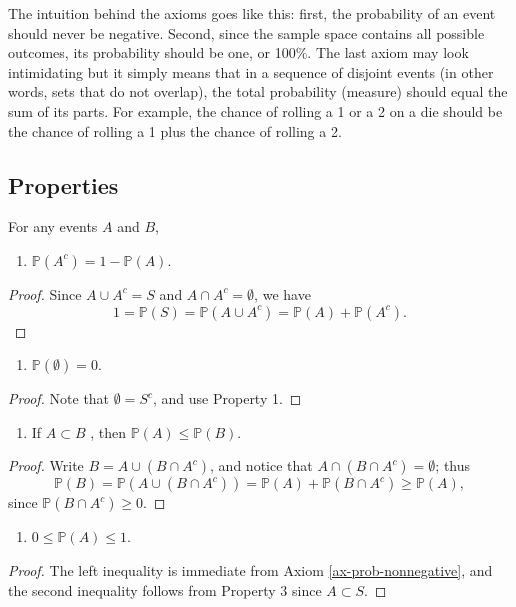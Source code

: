 \documentclass[captions=tableheading]{scrbook}
\begin{document}
The intuition behind the axioms goes like this: first, the probability of an event should never be negative. Second, since the sample space contains all possible outcomes, its probability should be one, or 100\%. The last axiom may look intimidating but it simply means that in a sequence of disjoint events (in other words, sets that do not overlap), the total probability (measure) should equal the sum of its parts. For example, the chance of rolling a 1 or a 2 on a die should be the chance of rolling a 1 plus the chance of rolling a 2.
\subsection{Properties}
\label{sec-4-4-2}


For any events \(A\) and \(B\),
\begin{enumerate}
\item \(\mathbb{P}(A^{c})=1-\mathbb{P}(A)\).
\end{enumerate}
\begin{proof}
  Since \(A\cup A^{c}=S\) and \(A\cap A^{c}=\emptyset\), we have
  \[
  1=\mathbb{P}(S)=\mathbb{P}(A\cup A^{c})=\mathbb{P}(A)+\mathbb{P}(A^{c}).
  \]
\end{proof}
\begin{enumerate}
\item \(\mathbb{P}(\emptyset)=0\).
\end{enumerate}
\begin{proof}
  Note that \(\emptyset=S^{c}\), and use Property 1.
\end{proof}
\begin{enumerate}
\item If \(A\subset B\) , then \(\mathbb{P}(A)\leq\mathbb{P}(B)\).
\end{enumerate}
\begin{proof}
  Write \(B=A\cup\left(B\cap A^{c}\right)\), and notice that \(A\cap\left(B\cap A^{c}\right)=\emptyset\); thus
  \[
  \mathbb{P}(B)=\mathbb{P}(A\cup\left(B\cap A^{c}\right))=\mathbb{P}(A)+\mathbb{P}\left(B\cap A^{c}\right)\geq\mathbb{P}(A),
  \]
  since \(\mathbb{P}\left(B\cap A^{c}\right)\ge0\). 
\end{proof}
\begin{enumerate}
\item \(0\leq\mathbb{P}(A)\leq1\).
\end{enumerate}
\begin{proof}
  The left inequality is immediate from Axiom \ref{ax-prob-nonnegative}, and the second inequality follows from Property 3 since \(A\subset S\).
\end{proof}
\end{document}
